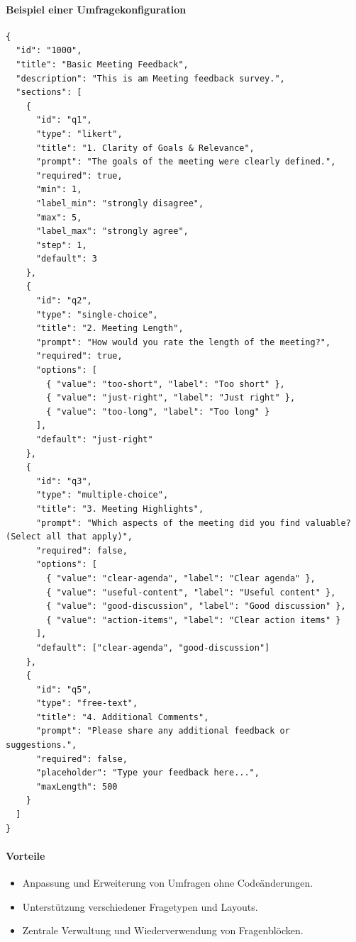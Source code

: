 \documentclass[12pt,a4paper]{report}
\begin{document}
\paragraph{Beispiel einer Umfragekonfiguration}
\begin{verbatim}
{
  "id": "1000",
  "title": "Basic Meeting Feedback",
  "description": "This is am Meeting feedback survey.",
  "sections": [
    {
      "id": "q1",
      "type": "likert",
      "title": "1. Clarity of Goals & Relevance",
      "prompt": "The goals of the meeting were clearly defined.",
      "required": true,
      "min": 1,
      "label_min": "strongly disagree",
      "max": 5,
      "label_max": "strongly agree",
      "step": 1,
      "default": 3
    },
    {
      "id": "q2",
      "type": "single-choice",
      "title": "2. Meeting Length",
      "prompt": "How would you rate the length of the meeting?",
      "required": true,
      "options": [
        { "value": "too-short", "label": "Too short" },
        { "value": "just-right", "label": "Just right" },
        { "value": "too-long", "label": "Too long" }
      ],
      "default": "just-right"
    },
    {
      "id": "q3",
      "type": "multiple-choice",
      "title": "3. Meeting Highlights",
      "prompt": "Which aspects of the meeting did you find valuable? (Select all that apply)",
      "required": false,
      "options": [
        { "value": "clear-agenda", "label": "Clear agenda" },
        { "value": "useful-content", "label": "Useful content" },
        { "value": "good-discussion", "label": "Good discussion" },
        { "value": "action-items", "label": "Clear action items" }
      ],
      "default": ["clear-agenda", "good-discussion"]
    },
    {
      "id": "q5",
      "type": "free-text",
      "title": "4. Additional Comments",
      "prompt": "Please share any additional feedback or suggestions.",
      "required": false,
      "placeholder": "Type your feedback here...",
      "maxLength": 500
    }
  ]
}

\end{verbatim}

\paragraph{Vorteile}
\begin{itemize}
  \item Anpassung und Erweiterung von Umfragen ohne Codeänderungen.
  \item Unterstützung verschiedener Fragetypen und Layouts.
  \item Zentrale Verwaltung und Wiederverwendung von Fragenblöcken.
\end{itemize}
\end{document}
